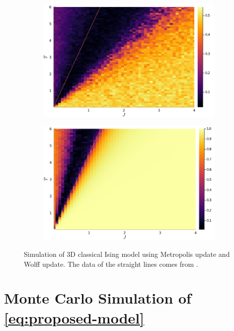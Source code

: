 \documentclass[hyperref, a4paper]{article}
\newcommand*{\cim}{classical Ising model }
\begin{document}
\begin{figure}
\begin{subfigure}{0.45\textwidth}
        \includegraphics[width=\textwidth]{../3d-ising-prototype/examples/isotropic/magnetization-wolff-random-init.PNG}
    \end{subfigure}
    \begin{subfigure}{0.45\textwidth}
        \includegraphics[width=\textwidth]{../3d-ising-prototype/examples/isotropic/magnetization-wolff-ones-init.PNG}
    \end{subfigure}
    \caption{Simulation of 3D \cim using Metropolis update and Wolff update. The data of the straight lines comes from \cite{Talapov_1996}.}
    \label{fig:3d-cim-benchmark}
\end{figure}

\section{Monte Carlo Simulation of \eqref{eq:proposed-model}}
\end{document}
